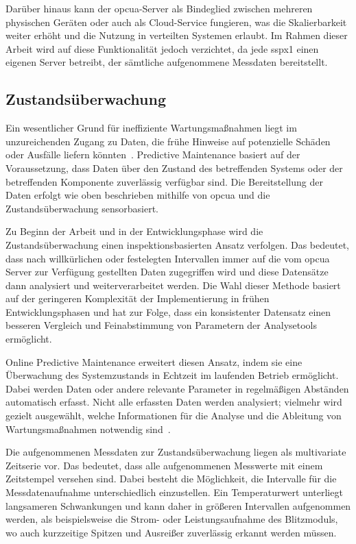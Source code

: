 Darüber hinaus kann der \ac{opcua}-Server als Bindeglied zwischen mehreren physischen Geräten oder auch als Cloud-Service fungieren,
was die Skalierbarkeit weiter erhöht und die Nutzung in verteilten Systemen erlaubt. Im Rahmen dieser Arbeit wird auf diese Funktionalität
jedoch verzichtet, da jede \ac{sspx1} einen eigenen Server betreibt, der sämtliche aufgenommene Messdaten bereitstellt.

\subsection{Zustandsüberwachung}\label{sec:zustandsueberwachung}
Ein wesentlicher Grund für ineffiziente Wartungsmaßnahmen liegt im unzureichenden Zugang zu Daten, die frühe Hinweise auf
potenzielle Schäden oder Ausfälle liefern könnten~\cite[S.~2]{Mobley2002}. Predictive Maintenance basiert auf der Voraussetzung, dass
Daten über den Zustand des betreffenden Systems oder der betreffenden Komponente zuverlässig verfügbar sind. Die Bereitstellung der
Daten erfolgt wie oben beschrieben mithilfe von \ac{opcua} und die Zustandsüberwachung sensorbasiert.

Zu Beginn der Arbeit und in der Entwicklungsphase wird die Zustandsüberwachung einen inspektionsbasierten Ansatz verfolgen. Das
bedeutet, dass nach willkürlichen oder festelegten Intervallen immer auf die vom \ac{opcua} Server zur Verfügung gestellten Daten
zugegriffen wird und diese Datensätze dann analysiert und weiterverarbeitet werden. Die Wahl dieser Methode basiert auf der
geringeren Komplexität der Implementierung in frühen Entwicklungsphasen und hat zur Folge, dass ein konsistenter Datensatz einen
besseren Vergleich und Feinabstimmung von Parametern der Analysetools ermöglicht.

Online Predictive Maintenance erweitert diesen Ansatz, indem sie eine Überwachung des Systemzustands in Echtzeit im laufenden Betrieb
ermöglicht. Dabei werden Daten oder andere relevante Parameter in regelmäßigen Abständen automatisch erfasst. Nicht alle erfassten
Daten werden analysiert; vielmehr wird gezielt ausgewählt, welche Informationen für die Analyse und die Ableitung von Wartungsmaßnahmen
notwendig sind~\cite{Lindstroem2017}. 

Die aufgenommenen Messdaten zur Zustandsüberwachung liegen als multivariate Zeitserie vor. Das bedeutet, dass alle aufgenommenen Messwerte
mit einem Zeitstempel versehen sind. Dabei besteht die Möglichkeit, die Intervalle für die Messdatenaufnahme unterschiedlich einzustellen.
Ein Temperaturwert unterliegt langsameren Schwankungen und kann daher in größeren Intervallen aufgenommen werden, als beispielsweise die
Strom- oder Leistungsaufnahme des Blitzmoduls, wo auch kurzzeitige Spitzen und Ausreißer zuverlässig erkannt werden müssen.

